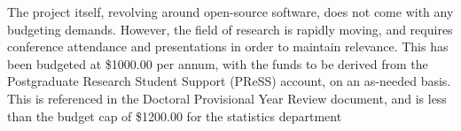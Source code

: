 \documentclass[a4paper,10pt]{article}
\begin{document}
The project itself, revolving around open-source software, does not come with any budgeting demands.
However, the field of research is rapidly moving, and requires conference attendance and presentations in order to maintain relevance.
This has been budgeted at \$1000.00 per annum, with the funds to be derived from the Postgraduate Research Student Support (PReSS) account, on an as-needed basis.
This is referenced in the Doctoral Provisional Year Review document, and is less than the budget cap of \$1200.00 for the statistics department

\printbibliography
\end{document}
